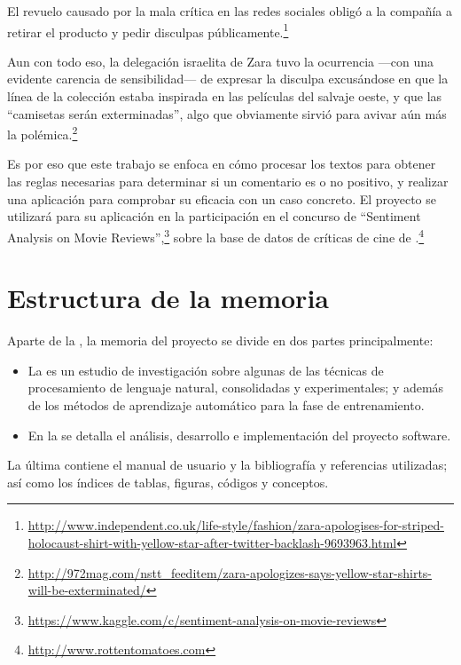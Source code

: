 \begin{example}
El revuelo causado por la mala crítica en las redes sociales obligó a la compañía a retirar el producto y pedir disculpas públicamente.\footnote{\url{http://www.independent.co.uk/life-style/fashion/zara-apologises-for-striped-holocaust-shirt-with-yellow-star-after-twitter-backlash-9693963.html}}

Aun con todo eso, la delegación israelita de Zara tuvo la ocurrencia ---con una evidente carencia de sensibilidad--- de expresar la disculpa excusándose en que la línea de la colección estaba inspirada en las películas del salvaje oeste, y que las ``camisetas serán exterminadas'', algo que obviamente sirvió para avivar aún más la polémica.\footnote{\url{http://972mag.com/nstt_feeditem/zara-apologizes-says-yellow-star-shirts-will-be-exterminated/}}
\end{example}

Es por eso que este trabajo se enfoca en cómo procesar los textos para obtener las reglas necesarias para determinar si un comentario es o no positivo, y realizar una aplicación para comprobar su eficacia con un caso concreto. El proyecto se utilizará para su aplicación en la participación en el concurso de  ``Sentiment Analysis on Movie Reviews'',\footnote{\url{https://www.kaggle.com/c/sentiment-analysis-on-movie-reviews}} sobre la base de datos de críticas de cine de .\footnote{\url{http://www.rottentomatoes.com}}



\section{Estructura de la memoria}

Aparte de la , la memoria del proyecto se divide en dos partes principalmente:
\begin{itemize}
\item La  es un estudio de investigación sobre algunas de las técnicas de procesamiento de lenguaje natural, consolidadas y experimentales; y además de los métodos de aprendizaje automático para la fase de entrenamiento.
\item En la  se detalla el análisis, desarrollo e implementación del proyecto software.
\end{itemize}

La última  contiene el manual de usuario y la bibliografía y referencias utilizadas; así como los índices de tablas, figuras, códigos y conceptos.
